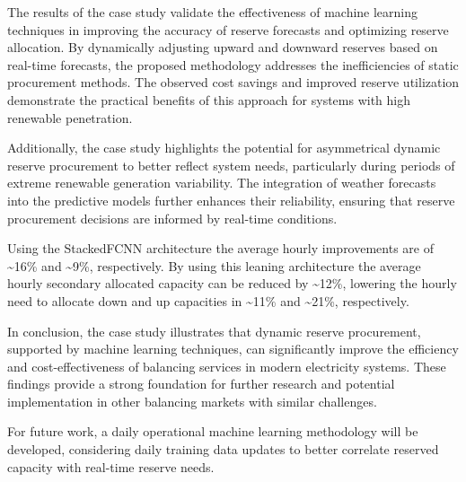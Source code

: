 The results of the case study validate the effectiveness of machine learning techniques in improving the accuracy of reserve forecasts and optimizing reserve allocation. By dynamically adjusting upward and downward reserves based on real-time forecasts, the proposed methodology addresses the inefficiencies of static procurement methods. The observed cost savings and improved reserve utilization demonstrate the practical benefits of this approach for systems with high renewable penetration.

Additionally, the case study highlights the potential for asymmetrical dynamic reserve procurement to better reflect system needs, particularly during periods of extreme renewable generation variability. The integration of weather forecasts into the predictive models further enhances their reliability, ensuring that reserve procurement decisions are informed by real-time conditions.

Using the StackedFCNN architecture the average hourly improvements are of \textasciitilde16\% and \textasciitilde9\%, respectively.
By using this leaning architecture the average hourly secondary allocated capacity can be reduced by \textasciitilde12\%, lowering the hourly need to allocate down and up capacities in \textasciitilde11\% and \textasciitilde21\%, respectively.

In conclusion, the case study illustrates that dynamic reserve procurement, supported by machine learning techniques, can significantly improve the efficiency and cost-effectiveness of balancing services in modern electricity systems. These findings provide a strong foundation for further research and potential implementation in other balancing markets with similar challenges.

For future work, a daily operational machine learning methodology will be developed, considering daily training data updates to better correlate reserved capacity with real-time reserve needs.



